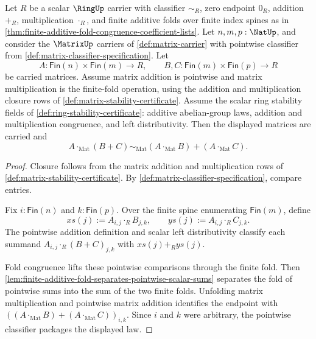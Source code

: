 \begin{theorem}
\label{thm:matrix-multiplication-left-distributes-over-addition}
Let $R$ be a scalar $\RingUp$ carrier with classifier $\sim_R$, zero endpoint
$0_R$, addition $+_R$, multiplication $\cdot_R$, and finite additive folds over
finite index spines as in \autoref{thm:finite-additive-fold-congruence-coefficient-lists}. Let
$n,m,p:\NatUp$, and consider the $\MatrixUp$ carriers of
\autoref{def:matrix-carrier} with pointwise classifier from
\autoref{def:matrix-classifier-specification}. Let
$$
A:\mathsf{Fin}(n)\times\mathsf{Fin}(m)\to R,
\qquad
B,C:\mathsf{Fin}(m)\times\mathsf{Fin}(p)\to R
$$
be carried matrices. Assume matrix addition is pointwise and matrix
multiplication is the finite-fold operation, using the addition and
multiplication closure rows of \autoref{def:matrix-stability-certificate}.
Assume the scalar ring stability fields of \autoref{def:ring-stability-certificate}:
additive abelian-group laws, addition and multiplication congruence, and left
distributivity. Then the displayed matrices are carried and
$$
A\cdot_{\mathrm{Mat}}(B+C)\sim_{\mathrm{Mat}}(A\cdot_{\mathrm{Mat}}B)+(A\cdot_{\mathrm{Mat}}C).
$$
\end{theorem}
\begin{proof}
Closure follows from the matrix addition and multiplication rows of
\autoref{def:matrix-stability-certificate}. By
\autoref{def:matrix-classifier-specification}, compare entries.

Fix $i:\mathsf{Fin}(n)$ and $k:\mathsf{Fin}(p)$. Over the finite spine
enumerating $\mathsf{Fin}(m)$, define
$$
xs(j):=A_{i,j}\cdot_RB_{j,k},
\qquad
ys(j):=A_{i,j}\cdot_RC_{j,k}.
$$
The pointwise addition definition and scalar left distributivity classify each
summand $A_{i,j}\cdot_R(B+C)_{j,k}$ with $xs(j)+_Rys(j)$.

Fold congruence lifts these pointwise comparisons through the finite fold. Then
\autoref{lem:finite-additive-fold-separates-pointwise-scalar-sums} separates the
fold of pointwise sums into the sum of the two finite folds. Unfolding matrix
multiplication and pointwise matrix addition identifies the endpoint with
$((A\cdot_{\mathrm{Mat}}B)+(A\cdot_{\mathrm{Mat}}C))_{i,k}$. Since $i$ and $k$
were arbitrary, the pointwise classifier packages the displayed law.
\end{proof}

